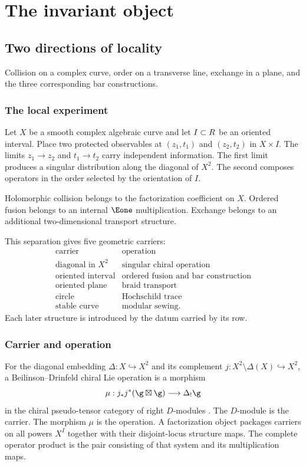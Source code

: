 \part{The invariant object}

\chapter{Two directions of locality}
\begin{summarybox}
Collision on a complex curve, order on a transverse line, exchange in a plane, and the three corresponding bar constructions.
\end{summarybox}

\section{The local experiment}
Let $X$ be a smooth complex algebraic curve and let $I\subset R$ be an oriented interval. Place two protected observables at $(z_1,t_1)$ and $(z_2,t_2)$ in $X\times I$. The limits $z_1\to z_2$ and $t_1\to t_2$ carry independent information. The first limit produces a singular distribution along the diagonal of $X^2$. The second composes operators in the order selected by the orientation of $I$.

\begin{principle}
Holomorphic collision belongs to the factorization coefficient on $X$. Ordered fusion belongs to an internal $\Eone$ multiplication. Exchange belongs to an additional two-dimensional transport structure.
\end{principle}

This separation gives five geometric carriers:
\[
\begin{array}{c|c}
\text{carrier}&\text{operation}\\ \hline
\text{diagonal in }X^2&\text{singular chiral operation}\\
\text{oriented interval}&\text{ordered fusion and bar construction}\\
\text{oriented plane}&\text{braid transport}\\
\text{circle}&\text{Hochschild trace}\\
\text{stable curve}&\text{modular sewing}.
\end{array}
\]
Each later structure is introduced by the datum carried by its row.

\section{Carrier and operation}
For the diagonal embedding $\Delta:X\hookrightarrow X^2$ and its complement $j:X^2\setminus\Delta(X)\hookrightarrow X^2$, a Beilinson--Drinfeld chiral Lie operation is a morphism
\[
 \mu:j_*j^*(\g\boxtimes\g)\longrightarrow \Delta_!\g
\]
in the chiral pseudo-tensor category of right $D$-modules \cite{BD04}. The $D$-module is the carrier. The morphism $\mu$ is the operation. A factorization object packages carriers on all powers $X^I$ together with their disjoint-locus structure maps. The complete operator product is the pair consisting of that system and its multiplication maps.

